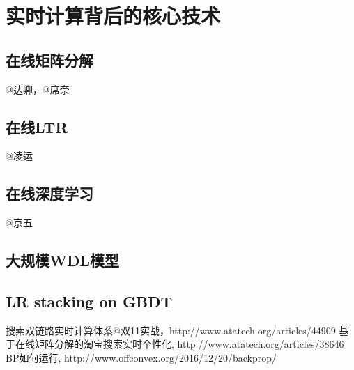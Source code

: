 
\chapter{实时计算背后的核心技术}
\thispagestyle{empty}

\setlength{\fboxrule}{0pt}\setlength{\fboxsep}{0cm}
\noindent\shadowbox{
\begin{tcolorbox}[arc=0mm,colback=lightblue,colframe=darkblue,title=学习目标与要求]

\end{tcolorbox}}
\setlength{\fboxrule}{1pt}\setlength{\fboxsep}{4pt} 

\section{在线矩阵分解}
	@达卿，@席奈

\section{在线LTR} 
	@凌运 

\section {在线深度学习} 
	@京五

\section{大规模WDL模型} 

\section{LR stacking on GBDT}

\begin{thebibliography}{99}
 搜索双链路实时计算体系@双11实战，http://www.atatech.org/articles/44909
 基于在线矩阵分解的淘宝搜索实时个性化, http://www.atatech.org/articles/38646
 BP如何运行, http://www.offconvex.org/2016/12/20/backprop/
\end{thebibliography}

 
